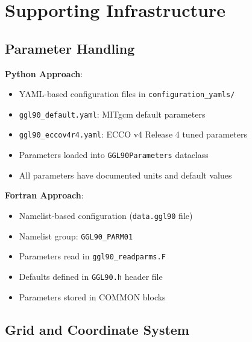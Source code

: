 \documentclass[11pt]{article}
\begin{document}
\section{Supporting Infrastructure}
\label{sec:infrastructure}

\subsection{Parameter Handling}

\textbf{Python Approach}:
\begin{itemize}
    \item YAML-based configuration files in \verb|configuration_yamls/|
    \item \verb|ggl90_default.yaml|: MITgcm default parameters
    \item \verb|ggl90_eccov4r4.yaml|: ECCO v4 Release 4 tuned parameters
    \item Parameters loaded into \verb|GGL90Parameters| dataclass
    \item All parameters have documented units and default values
\end{itemize}

\textbf{Fortran Approach}:
\begin{itemize}
    \item Namelist-based configuration (\verb|data.ggl90| file)
    \item Namelist group: \verb|GGL90_PARM01|
    \item Parameters read in \verb|ggl90_readparms.F|
    \item Defaults defined in \verb|GGL90.h| header file
    \item Parameters stored in COMMON blocks
\end{itemize}

\subsection{Grid and Coordinate System}
\end{document}
